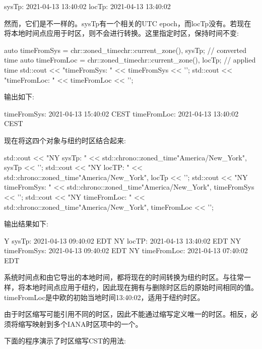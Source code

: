 \begin{shell}
sysTp:     2021-04-13 13:40:02
locTp:     2021-04-13 13:40:02
\end{shell}

然而，它们是不一样的。sysTp有一个相关的UTC epoch，而locTp没有。若现在将本地时间点应用于时区，则不会进行转换。这里指定时区，保持时间不变:

\begin{cpp}
auto timeFromSys = chr::zoned_time{chr::current_zone(), sysTp}; // converted time
auto timeFromLoc = chr::zoned_time{chr::current_zone(), locTp}; // applied time
std::cout << "timeFromSys: " << timeFromSys << '\n';
std::cout << "timeFromLoc: " << timeFromLoc << '\n';
\end{cpp}

输出如下:

\begin{shell}
timeFromSys: 2021-04-13 15:40:02 CEST
timeFromLoc: 2021-04-13 13:40:02 CEST
\end{shell}

现在将这四个对象与纽约时区结合起来:

\begin{cpp}
std::cout << "NY sysTp: "
		  << std::chrono::zoned_time{"America/New_York", sysTp} << '\n';
std::cout << "NY locTP: "
		  << std::chrono::zoned_time{"America/New_York", locTp} << '\n';
std::cout << "NY timeFromSys: "
		  << std::chrono::zoned_time{"America/New_York", timeFromSys} << '\n';
std::cout << "NY timeFromLoc: "
		  << std::chrono::zoned_time{"America/New_York", timeFromLoc} << '\n';
\end{cpp}

输出结果如下:

\begin{shell}
Y sysTp:        2021-04-13 09:40:02 EDT
NY locTP:       2021-04-13 13:40:02 EDT
NY timeFromSys: 2021-04-13 09:40:02 EDT
NY timeFromLoc: 2021-04-13 07:40:02 EDT
\end{shell}

系统时间点和由它导出的本地时间，都将现在的时间转换为纽约时区。与往常一样，将本地时间点应用于纽约，因此现在拥有与删除时区后的原始时间相同的值。timeFromLoc是中欧的初始当地时间13:40:02，适用于纽约时区。


由于时区缩写可能引用不同的时区，因此不能通过缩写定义唯一的时区。相反，必须将缩写映射到多个IANA时区项中的一个。

下面的程序演示了时区缩写CST的用法:


